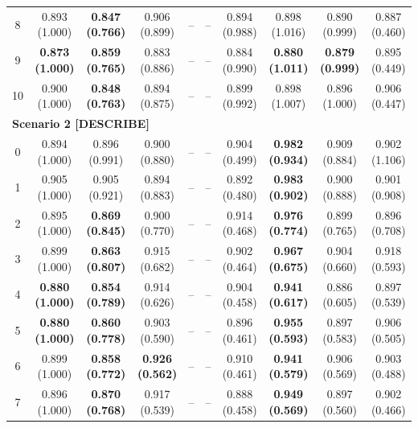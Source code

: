 \begin{table}[!h]
{\begin{tabular}[t]{|c|ccccccccc|}
\hspace{1em}8 & 0.893 (1.000) & \textbf{0.847 (0.766)} & 0.906 (0.899) & -- & -- & 0.894 (0.988) & 0.898 (1.016) & 0.890 (0.999) & 0.887 (0.460)\\
\hspace{1em}9 & \textbf{0.873 (1.000)} & \textbf{0.859 (0.765)} & 0.883 (0.886) & -- & -- & 0.884 (0.990) & \textbf{0.880 (1.011)} & \textbf{0.879 (0.999)} & 0.895 (0.449)\\
\hspace{1em}10 & 0.900 (1.000) & \textbf{0.848 (0.763)} & 0.894 (0.875) & -- & -- & 0.899 (0.992) & 0.898 (1.007) & 0.896 (1.000) & 0.906 (0.447)\\
\hline
\multicolumn{10}{|l|}{\textbf{Scenario 2 [DESCRIBE]}}\\
\hspace{1em}0 & 0.894 (1.000) & 0.896 (0.991) & 0.900 (0.880) & -- & -- & 0.904 (0.499) & \textbf{0.982 (0.934)} & 0.909 (0.884) & 0.902 (1.106)\\
\hspace{1em}1 & 0.905 (1.000) & 0.905 (0.921) & 0.894 (0.883) & -- & -- & 0.892 (0.480) & \textbf{0.983 (0.902)} & 0.900 (0.888) & 0.901 (0.908)\\
\hspace{1em}2 & 0.895 (1.000) & \textbf{0.869 (0.845)} & 0.900 (0.770) & -- & -- & 0.914 (0.468) & \textbf{0.976 (0.774)} & 0.899 (0.765) & 0.896 (0.708)\\
\hspace{1em}3 & 0.899 (1.000) & \textbf{0.863 (0.807)} & 0.915 (0.682) & -- & -- & 0.902 (0.464) & \textbf{0.967 (0.675)} & 0.904 (0.660) & 0.918 (0.593)\\
\hspace{1em}4 & \textbf{0.880 (1.000)} & \textbf{0.854 (0.789)} & 0.914 (0.626) & -- & -- & 0.904 (0.458) & \textbf{0.941 (0.617)} & 0.886 (0.605) & 0.897 (0.539)\\
\hspace{1em}5 & \textbf{0.880 (1.000)} & \textbf{0.860 (0.778)} & 0.903 (0.590) & -- & -- & 0.896 (0.461) & \textbf{0.955 (0.593)} & 0.897 (0.583) & 0.906 (0.505)\\
\hspace{1em}6 & 0.899 (1.000) & \textbf{0.858 (0.772)} & \textbf{0.926 (0.562)} & -- & -- & 0.910 (0.461) & \textbf{0.941 (0.579)} & 0.906 (0.569) & 0.903 (0.488)\\
\hspace{1em}7 & 0.896 (1.000) & \textbf{0.870 (0.768)} & 0.917 (0.539) & -- & -- & 0.888 (0.458) & \textbf{0.949 (0.569)} & 0.897 (0.560) & 0.902 (0.466)\\

\end{tabular}}
\end{table}
